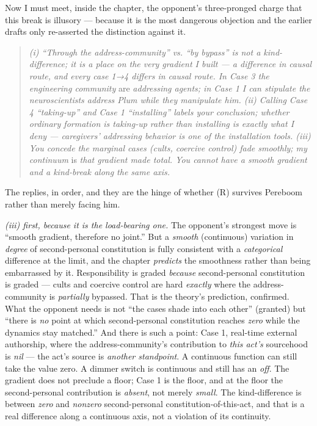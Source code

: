 \documentclass[11pt]{article}
\begin{document}
Now I must meet, inside the chapter, the opponent's three-pronged charge that this break is illusory — because it is the most dangerous objection and the earlier drafts only re-asserted the distinction against it.

\begin{quote}
\emph{(i) ``Through the address-community'' vs. ``by bypass'' is not a kind-difference; it is a place on the very gradient I built — a difference in causal route, and every case 1→4 differs in causal route. In Case 3 the engineering community} are \emph{addressing agents; in Case 1 I can stipulate the neuroscientists address Plum while they manipulate him. (ii) Calling Case 4 ``taking-up'' and Case 1 ``installing'' labels your conclusion; whether ordinary formation is taking-up rather than installing is exactly what I deny — caregivers' addressing behavior is one of the installation tools. (iii) You concede the marginal cases (cults, coercive control) fade smoothly; my continuum} is \emph{that gradient made total. You cannot have a smooth gradient and a kind-break along the same axis.}
\end{quote}

The replies, in order, and they are the hinge of whether (R) survives Pereboom rather than merely facing him.

\emph{(iii) first, because it is the load-bearing one.} The opponent's strongest move is ``smooth gradient, therefore no joint.'' But a \emph{smooth} (continuous) variation in \emph{degree} of second-personal constitution is fully consistent with a \emph{categorical} difference at the limit, and the chapter \emph{predicts} the smoothness rather than being embarrassed by it. Responsibility is graded \emph{because} second-personal constitution is graded — cults and coercive control are hard \emph{exactly} where the address-community is \emph{partially} bypassed. That is the theory's prediction, confirmed. What the opponent needs is not ``the cases shade into each other'' (granted) but ``there is \emph{no} point at which second-personal constitution reaches \emph{zero} while the dynamics stay matched.'' And there is such a point: Case 1, real-time external authorship, where the address-community's contribution to \emph{this act's} sourcehood is \emph{nil} — the act's source is \emph{another standpoint}. A continuous function can still take the value zero. A dimmer switch is continuous and still has an \emph{off}. The gradient does not preclude a floor; Case 1 is the floor, and at the floor the second-personal contribution is \emph{absent}, not merely \emph{small}. The kind-difference is between \emph{zero} and \emph{nonzero} second-personal constitution-of-this-act, and that is a real difference along a continuous axis, not a violation of its continuity.
\end{document}
